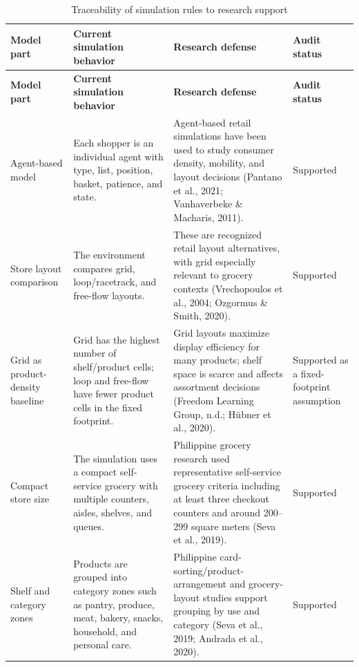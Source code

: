 \documentclass[12pt]{article}
\begin{document}
\begingroup
\small
\setlength{\tabcolsep}{3pt}
\begin{longtable}{>{\raggedright\arraybackslash}p{} >{\raggedright\arraybackslash}p{} >{\raggedright\arraybackslash}p{} >{\raggedright\arraybackslash}p{}}
\caption{Traceability of simulation rules to research support}
\label{tab:traceability}\\
\toprule
\textbf{Model part} & \textbf{Current simulation behavior} & \textbf{Research defense} & \textbf{Audit status} \\
\midrule
\endfirsthead
\toprule
\textbf{Model part} & \textbf{Current simulation behavior} & \textbf{Research defense} & \textbf{Audit status} \\
\midrule
\endhead

Agent-based model & Each shopper is an individual agent with type, list, position, basket, patience, and state. & Agent-based retail simulations have been used to study consumer density, mobility, and layout decisions (Pantano et al., 2021; Vanhaverbeke \& Macharis, 2011). & Supported \\

Store layout comparison & The environment compares grid, loop/racetrack, and free-flow layouts. & These are recognized retail layout alternatives, with grid especially relevant to grocery contexts (Vrechopoulos et al., 2004; Ozgormus \& Smith, 2020). & Supported \\

Grid as product-density baseline & Grid has the highest number of shelf/product cells; loop and free-flow have fewer product cells in the fixed footprint. & Grid layouts maximize display efficiency for many products; shelf space is scarce and affects assortment decisions (Freedom Learning Group, n.d.; H\"ubner et al., 2020). & Supported as a fixed-footprint assumption \\

Compact store size & The simulation uses a compact self-service grocery with multiple counters, aisles, shelves, and queues. & Philippine grocery research used representative self-service grocery criteria including at least three checkout counters and around 200--299 square meters (Seva et al., 2019). & Supported \\

Shelf and category zones & Products are grouped into category zones such as pantry, produce, meat, bakery, snacks, household, and personal care. & Philippine card-sorting/product-arrangement and grocery-layout studies support grouping by use and category (Seva et al., 2019; Andrada et al., 2020). & Supported \\


\end{longtable}
\end{document}
